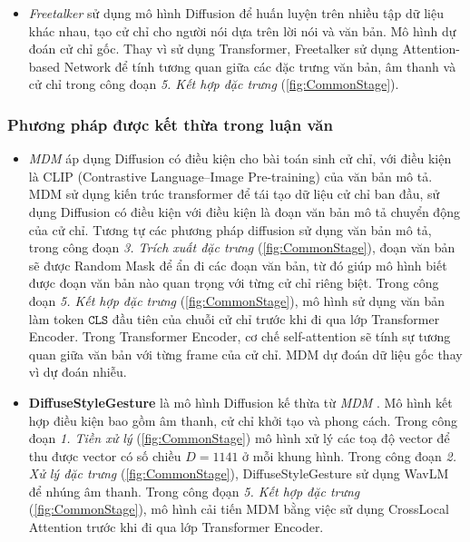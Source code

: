 \begin{itemize}
	\item \textit{Freetalker} \cite{yang2024freetalker} sử dụng mô hình Diffusion để huấn luyện trên nhiều tập dữ liệu khác nhau, tạo cử chỉ cho người nói dựa trên lời nói và văn bản. Mô hình dự đoán cử chỉ gốc. Thay vì sử dụng Transformer, Freetalker sử dụng Attention-based Network để tính tương quan giữa các đặc trưng văn bản, âm thanh và cử chỉ trong công đoạn \textit{5. Kết hợp đặc trưng} (\autoref{fig:CommonStage}).
	
\end{itemize}


\subsubsection{Phương pháp được kết thừa trong luận văn}

\begin{itemize}
	\item \textit{MDM} \cite{tevet2022human}  áp dụng Diffusion có điều kiện cho bài toán sinh cử chỉ, với điều kiện là CLIP (Contrastive Language–Image Pre-training) của văn bản mô tả. MDM sử dụng kiến trúc transformer để tái tạo dữ liệu cử chỉ ban đầu, sử dụng Diffusion có điều kiện với điều kiện là đoạn văn bản mô tả chuyển động của cử chỉ. Tương tự các phương pháp diffusion sử dụng văn bản mô tả, trong công đoạn \textit{3. Trích xuất đặc trưng} (\autoref{fig:CommonStage}), đoạn văn bản sẽ được Random Mask để ẩn đi các đoạn văn bản, từ đó giúp mô hình biết được đoạn văn bản nào quan trọng với từng cử chỉ riêng biệt.
	Trong công đoạn \textit{5. Kết hợp đặc trưng} (\autoref{fig:CommonStage}), mô hình sử dụng văn bản làm token $\texttt{CLS}$ đầu tiên của chuỗi cử chỉ trước khi đi qua lớp Transformer Encoder. Trong Transformer Encoder, cơ chế self-attention sẽ tính sự tương quan giữa văn bản với từng frame của cử chỉ. MDM dự đoán dữ liệu gốc thay vì dự đoán nhiễu.
	
	\item \textbf{DiffuseStyleGesture} \cite{yang2023diffusestylegesture} là mô hình Diffusion kế thừa từ \textit{MDM} \cite{tevet2022human}. Mô hình kết hợp điều kiện bao gồm âm thanh, cử chỉ khởi tạo và phong cách. Trong công đoạn \textit{1. Tiền xử lý} (\autoref{fig:CommonStage}) mô hình xử lý các toạ độ vector để thu được vector có số chiều $D=1141$ ở mỗi khung hình. Trong công đoạn \textit{2. Xử lý đặc trưng} (\autoref{fig:CommonStage}), DiffuseStyleGesture sử dụng WavLM để nhúng âm thanh. Trong công đọạn \textit{5. Kết hợp đặc trưng} (\autoref{fig:CommonStage}), mô hình cải tiến MDM bằng việc sử dụng CrossLocal Attention trước khi đi qua lớp Transformer Encoder.
\end{itemize}

